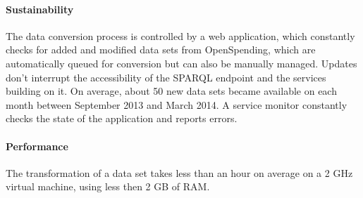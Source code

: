 \documentclass[sw]{iosart2x}
\begin{document}
\paragraph{Sustainability}
The data conversion process is controlled by a web application\footnotemark{}, which constantly checks for added and modified data sets from OpenSpending, which are automatically queued for conversion but can also be manually managed.
Updates don't interrupt the accessibility of the SPARQL endpoint and the services building on it.
On average, about 50 new data sets became available on each month between September 2013 and March 2014.
A service monitor constantly checks the state of the application and reports errors.




\paragraph{Performance}
The transformation of a data set takes less than an hour on average on a 2 GHz virtual machine, using less then 2 GB of RAM.
\end{document}

